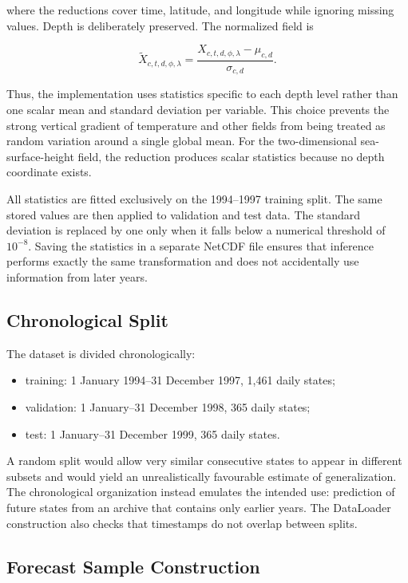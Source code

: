 where the reductions cover time, latitude, and longitude while ignoring missing values. Depth is deliberately preserved. The normalized field is

\[
\widetilde{X}_{c,t,d,\phi,\lambda}
=
\frac{X_{c,t,d,\phi,\lambda}-\mu_{c,d}}
{\sigma_{c,d}}.
\]

Thus, the implementation uses statistics specific to each depth level rather than one scalar mean and standard deviation per variable. This choice prevents the strong vertical gradient of temperature and other fields from being treated as random variation around a single global mean. For the two-dimensional sea-surface-height field, the reduction produces scalar statistics because no depth coordinate exists.

All statistics are fitted exclusively on the 1994--1997 training split. The same stored values are then applied to validation and test data. The standard deviation is replaced by one only when it falls below a numerical threshold of $10^{-8}$. Saving the statistics in a separate NetCDF file ensures that inference performs exactly the same transformation and does not accidentally use information from later years.

\subsection{Chronological Split}

The dataset is divided chronologically:

\begin{itemize}
  \item training: 1 January 1994--31 December 1997, 1,461 daily states;
  \item validation: 1 January--31 December 1998, 365 daily states;
  \item test: 1 January--31 December 1999, 365 daily states.
\end{itemize}

A random split would allow very similar consecutive states to appear in different subsets and would yield an unrealistically favourable estimate of generalization. The chronological organization instead emulates the intended use: prediction of future states from an archive that contains only earlier years. The DataLoader construction also checks that timestamps do not overlap between splits.

\subsection{Forecast Sample Construction}

